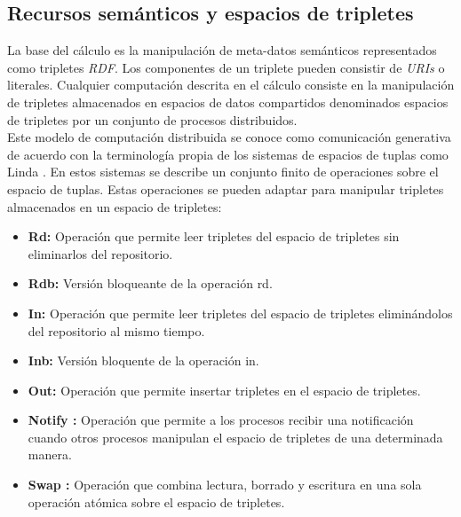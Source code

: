 \subsection{Recursos sem\'anticos y espacios de tripletes}

La base del c\'alculo es la manipulaci\'on de meta-datos sem\'anticos representados como tripletes \textit{RDF}. Los componentes de un triplete pueden consistir de \textit{URIs} o literales. Cualquier computaci\'on descrita en el c\'alculo consiste en la manipulaci\'on de tripletes almacenados en espacios de datos compartidos denominados espacios de tripletes \cite{fensel2004triple} por un conjunto de procesos distribuidos.\\
Este modelo de computaci\'on distribuida se conoce como comunicaci\'on generativa de acuerdo con la terminolog\'ia propia de los sistemas de espacios de tuplas como Linda \cite{linda}. En estos sistemas se describe un conjunto finito de operaciones sobre el espacio de tuplas. Estas operaciones se pueden adaptar para manipular tripletes almacenados en un espacio de tripletes:

\begin{itemize}
\item \textbf{Rd:} Operaci\'on que permite leer tripletes del espacio de tripletes sin eliminarlos del repositorio. 
\item \textbf{Rdb:} Versi\'on bloqueante de la operaci\'on rd.
\item \textbf{In:} Operaci\'on que permite leer tripletes del espacio de tripletes elimin\'andolos del repositorio al mismo tiempo.
\item \textbf{Inb:} Versi\'on bloquente de la operaci\'on in.
\item \textbf{Out:} Operaci\'on que permite insertar tripletes en el espacio de tripletes.
\item \textbf{Notify \cite{busi2000process}:} Operaci\'on que permite a los procesos recibir una notificaci\'on cuando otros procesos manipulan el espacio de tripletes de una determinada manera.
\item \textbf{Swap \cite{bessani2008depspace}:} Operaci\'on que combina lectura, borrado y escritura en una sola operaci\'on at\'omica sobre el espacio de tripletes.

\end{itemize}

